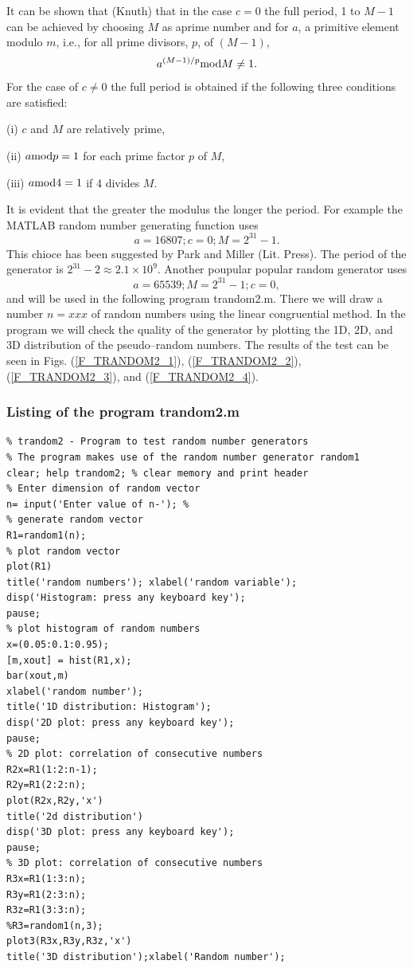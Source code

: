 It can be shown that (Knuth)  that in the case $c=0$ the full 
period, 1 to $M-1$ can be achieved by choosing $M$ as aprime 
number and for $a$, a primitive element modulo $m$, i.e., for all 
prime divisors, $p$, of $(M-1)$, 
\begin{equation*}
a^{(M-1)/p} {\rm mod} M \ne 1.
\end{equation*}
For the case of $c\ne 0$ the full period is obtained if the 
following three conditions are satisfied:

(i) $c$ and $M$ are relatively prime,

(ii) $a {\rm mod} p = 1$ for each prime factor $p$ of $M$,

(iii) $a {\rm mod} 4 = 1$ if 4 divides $M$.

It is evident that the greater the modulus the longer the period.
For example the MATLAB random number generating function uses
\begin{equation*}
a= 16807; c=0; M=2^{31}-1.
\end{equation*}
This chioce has been suggested by Park and Miller (Lit. Press).
The period of the generator is $2^{31}-2 \approx 2.1 \times 10^9$.
Another poupular popular random generator uses
\begin{equation*}
a= 65539; M=2^{31}-1; c=0,
\end{equation*}
and will be used in the following program {\sf trandom2.m}. There 
we will draw a number $n=xxx$ of random numbers using the linear 
congruential method. In the program we will check the quality of 
the generator by plotting the 1D, 2D, and 3D distribution of the 
pseudo--random numbers. The results of the test can be seen in 
Figs. (\ref{F_TRANDOM2_1}), (\ref{F_TRANDOM2_2}), 
(\ref{F_TRANDOM2_3}), and (\ref{F_TRANDOM2_4}).



\subsubsection{Listing of the program trandom2.m}
\begin{verbatim}
% trandom2 - Program to test random number generators
% The program makes use of the random number generator random1
clear; help trandom2; % clear memory and print header
% Enter dimension of random vector
n= input('Enter value of n-'); % 
% generate random vector
R1=random1(n);
% plot random vector
plot(R1)
title('random numbers'); xlabel('random variable');
disp('Histogram: press any keyboard key');
pause;
% plot histogram of random numbers
x=(0.05:0.1:0.95);
[m,xout] = hist(R1,x);
bar(xout,m)
xlabel('random number');
title('1D distribution: Histogram');
disp('2D plot: press any keyboard key');
pause;
% 2D plot: correlation of consecutive numbers
R2x=R1(1:2:n-1);
R2y=R1(2:2:n);
plot(R2x,R2y,'x')
title('2d distribution')
disp('3D plot: press any keyboard key');
pause;
% 3D plot: correlation of consecutive numbers
R3x=R1(1:3:n);
R3y=R1(2:3:n);
R3z=R1(3:3:n);
%R3=random1(n,3);
plot3(R3x,R3y,R3z,'x')
title('3D distribution');xlabel('Random number');
\end{verbatim}

